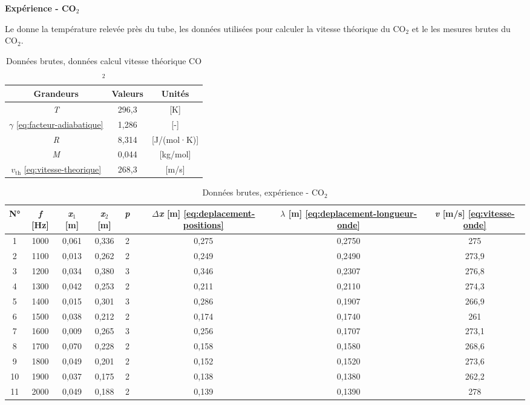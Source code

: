 \medskip

\textbf{Expérience - CO$_2$}

Le  donne la température relevée près du tube, les données utilisées pour calculer la vitesse théorique du CO$_2$ et le  les mesures brutes du CO$_2$.

\begin{table}[H]
    \centering
    \begin{tabular}{ccc}
        \toprule
        Grandeurs & Valeurs & Unités \\
        \midrule
        \textit{T} & 296,3 & [K] \\
        $\gamma$ \eqref{eq:facteur-adiabatique} & 1,286 & [-] \\
        \textit{R} & 8,314 & [J/(mol·K)] \\
        \textit{M} & 0,044 & [kg/mol] \\
        $v_{\mathrm{th}}$ \eqref{eq:vitesse-theorique} & 268,3 & [m/s] \\
        \bottomrule
    \end{tabular}
    \caption{Données brutes, données calcul vitesse théorique CO$_2$}
    \label{tab:temperature-co2}
\end{table}

\begin{table}[H]
    \centering
    \small
    \begin{tabular}{cccccccc}
        \toprule
        N° & \textit{f} [Hz] & \textit{x}$_1$ [m] & \textit{x}$_2$ [m] & \textit{p} & $\Delta$\textit{x} [m] \eqref{eq:deplacement-positions} & $\lambda$ [m] \eqref{eq:deplacement-longueur-onde} & \textit{v} [m/s] \eqref{eq:vitesse-onde} \\
        \midrule
        1 & 1000 & 0{,}061 & 0{,}336 & 2 & 0{,}275 & 0{,}2750 & 275 \\
        2 & 1100 & 0{,}013 & 0{,}262 & 2 & 0{,}249 & 0{,}2490 & 273{,}9 \\
        3 & 1200 & 0{,}034 & 0{,}380 & 3 & 0{,}346 & 0{,}2307 & 276{,}8 \\
        4 & 1300 & 0{,}042 & 0{,}253 & 2 & 0{,}211 & 0{,}2110 & 274{,}3 \\
        5 & 1400 & 0{,}015 & 0{,}301 & 3 & 0{,}286 & 0{,}1907 & 266{,}9 \\
        6 & 1500 & 0{,}038 & 0{,}212 & 2 & 0{,}174 & 0{,}1740 & 261 \\
        7 & 1600 & 0{,}009 & 0{,}265 & 3 & 0{,}256 & 0{,}1707 & 273{,}1 \\
        8 & 1700 & 0{,}070 & 0{,}228 & 2 & 0{,}158 & 0{,}1580 & 268{,}6 \\
        9 & 1800 & 0{,}049 & 0{,}201 & 2 & 0{,}152 & 0{,}1520 & 273{,}6 \\
        10 & 1900 & 0{,}037 & 0{,}175 & 2 & 0{,}138 & 0{,}1380 & 262{,}2 \\
        11 & 2000 & 0{,}049 & 0{,}188 & 2 & 0{,}139 & 0{,}1390 & 278 \\
        \bottomrule
    \end{tabular}
    \caption{Données brutes, expérience - CO$_2$}
    \label{tab:mesures-co2}
\end{table}
